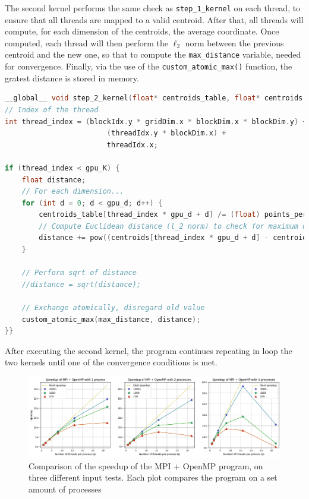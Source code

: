 \documentclass[11pt, journal]{IEEEtran}
\newcommand{\nwl}{

\vspace{11pt}

}
\begin{document}
The second kernel performs the same check as \verb|step_1_kernel| on each thread, to ensure that all threads are mapped to a valid centroid. After that, all threads will compute, for each dimension of the centroids, the average coordinate. Once computed, each thread will then perform the $\ell_2$ norm between the previous centroid and the new one, so that to compute the \verb|max_distance| variable, needed for convergence. Finally, via the use of the \verb|custom_atomic_max()| function, the gratest distance is stored in memory.
\nwl
\begin{lstlisting}[language = C]
__global__ void step_2_kernel(float* centroids_table, float* centroids, int* points_per_class, float* max_distance) {
// Index of the thread
int thread_index = (blockIdx.y * gridDim.x * blockDim.x * blockDim.y) + (blockIdx.x * blockDim.x * blockDim.y) +
                        (threadIdx.y * blockDim.x) +
                        threadIdx.x;

if (thread_index < gpu_K) {
    float distance;
    // For each dimension...
    for (int d = 0; d < gpu_d; d++) {
        centroids_table[thread_index * gpu_d + d] /= (float) points_per_class[thread_index];
        // Compute Euclidean distance (l_2 norm) to check for maximum distance
        distance += pow((centroids[thread_index * gpu_d + d] - centroids_table[thread_index * gpu_d + d]), 2);
    }

    // Perform sqrt of distance
    //distance = sqrt(distance);

    // Exchange atomically, disregard old value
    custom_atomic_max(max_distance, distance);
}}
\end{lstlisting}

After executing the second kernel, the program continues repeating in loop the two kernels until one of the convergence conditions is met.

\begin{figure}
    \label{stats_mpi_omp}
    \centering
    \includegraphics[width=\linewidth]{imgs/mpi_omp_speedup.png}

    \caption{Comparison of the speedup of the MPI + OpenMP program, on three different input tests. Each plot compares the program on a set amount of processes}
\end{figure}
\end{document}
